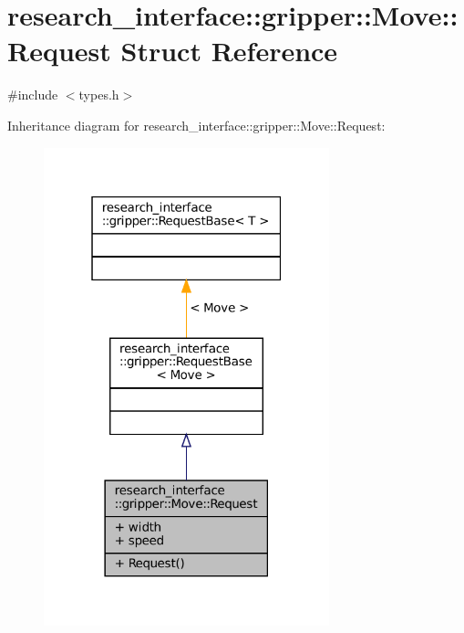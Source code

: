 \hypertarget{structresearch__interface_1_1gripper_1_1Move_1_1Request}{}\section{research\+\_\+interface\+:\+:gripper\+:\+:Move\+:\+:Request Struct Reference}
\label{structresearch__interface_1_1gripper_1_1Move_1_1Request}


{\ttfamily \#include $<$types.\+h$>$}



Inheritance diagram for research\+\_\+interface\+:\+:gripper\+:\+:Move\+:\+:Request\+:
\nopagebreak
\begin{figure}[H]
\begin{center}
\leavevmode
\includegraphics[width=235pt]{structresearch__interface_1_1gripper_1_1Move_1_1Request__inherit__graph}
\end{center}
\end{figure}


